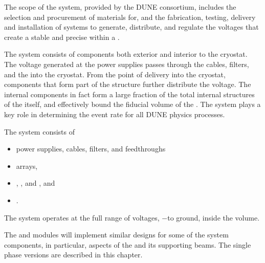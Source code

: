 
The scope of the \single {} system, provided by the DUNE  consortium, includes the selection and procurement of materials for, and the fabrication, testing, delivery and installation of systems to generate, distribute, and regulate the voltages that
create a stable and precise \efield{} within a . 

The  system consists of components both exterior and interior to the cryostat. The voltage generated at the  power supplies passes through the cables, filters, and the  \fdth into the cryostat. From the point of delivery into the cryostat, components that form part of the  structure further distribute the voltage. The internal  components in fact form a large fraction of the total internal structures of the  itself, and  
 effectively bound the  fiducial volume of the %
 . The  system plays a key role in determining the event rate for all DUNE physics processes.

The  system consists of
\begin{itemize}
\item {} power supplies, cables, filters, and feedthroughs
\item {} arrays,
\item {}, , and , and
\item {}.
\end{itemize}


The system operates at the full range of voltages, %
$-$\sptargetdriftvoltpos to ground, inside the  volume. 

The \single and \dual modules will implement similar designs for some
 of the  system components, %
 in particular, aspects of the  and its supporting beams. The single phase versions are described in this chapter. 
 
